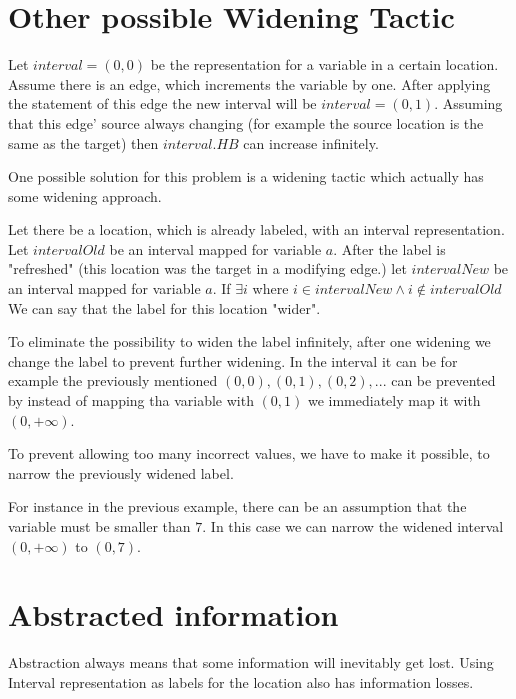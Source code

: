 \section{Other possible Widening Tactic}

Let $interval = (0,0)$ be the representation for a variable in a certain location. Assume there is an edge, which increments the variable by one. After applying the statement of this edge the new interval will be $interval = (0, 1)$. Assuming that this edge' source always changing (for example the source location is the same as the target) then $interval.HB$ can increase infinitely.

One possible solution for this problem is a widening tactic which actually has some widening approach.

Let there be a location, which is already labeled, with an interval representation. Let $intervalOld$ be an interval mapped for variable $a$. After the label is "refreshed" (this location was the target in a modifying edge.) let $intervalNew$ be an interval mapped for variable $a$. If $\exists i$ where $i \in intervalNew \land i \notin intervalOld$ We can say that the label for this location "wider".

To eliminate the possibility to widen the label infinitely, after one widening we change the label to prevent further widening. In the interval it can be for example the previously mentioned $(0, 0), (0,1), (0,2), ...$ can be prevented by instead of mapping tha variable with $(0,1)$ we immediately map it with $(0, +\infty)$.

To prevent allowing too many incorrect values, we have to make it possible, to narrow the previously widened label.

For instance in the previous example, there can be an assumption that the variable must be smaller than $7$. In this case we can narrow the widened interval $(0,+\infty)$ to $ (0, 7)$.


\section{Abstracted information}

Abstraction always means that some information will inevitably get lost. Using Interval representation as labels for the location also has information losses.

